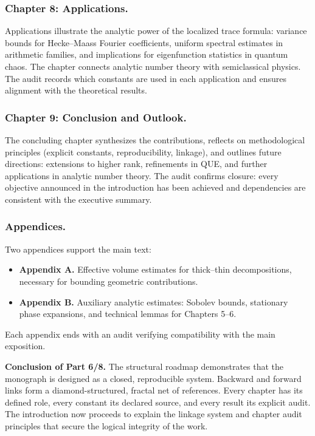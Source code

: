 \subsubsection*{Chapter 8: Applications.}
Applications illustrate the analytic power of the localized trace formula:
variance bounds for Hecke–Maass Fourier coefficients,
uniform spectral estimates in arithmetic families,
and implications for eigenfunction statistics in quantum chaos.
The chapter connects analytic number theory with semiclassical physics.
The audit records which constants are used in each application
and ensures alignment with the theoretical results.

\subsubsection*{Chapter 9: Conclusion and Outlook.}
The concluding chapter synthesizes the contributions,
reflects on methodological principles (explicit constants, reproducibility, linkage),
and outlines future directions:
extensions to higher rank,
refinements in QUE,
and further applications in analytic number theory.
The audit confirms closure: every objective announced in the introduction
has been achieved and dependencies are consistent with the executive summary.

\subsubsection*{Appendices.}
Two appendices support the main text:
\begin{itemize}
  \item \textbf{Appendix A.} Effective volume estimates for thick–thin decompositions,
        necessary for bounding geometric contributions.
  \item \textbf{Appendix B.} Auxiliary analytic estimates:
        Sobolev bounds, stationary phase expansions,
        and technical lemmas for Chapters 5–6.
\end{itemize}
Each appendix ends with an audit verifying compatibility with the main exposition.

\medskip

\noindent\textbf{Conclusion of Part 6/8.}
The structural roadmap demonstrates that the monograph is designed as a closed, reproducible system.
Backward and forward links form a diamond-structured, fractal net of references.
Every chapter has its defined role,
every constant its declared source,
and every result its explicit audit.
The introduction now proceeds to explain the linkage system and chapter audit principles
that secure the logical integrity of the work.

